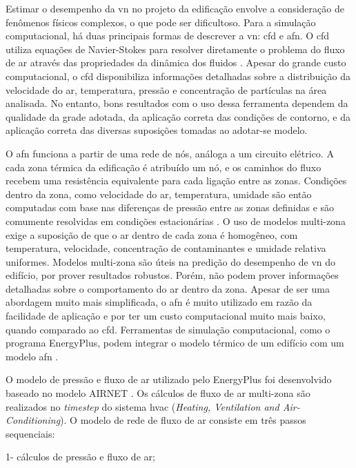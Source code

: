 \documentclass[brazil,hardcopy,openany]{ufscthesis} %
\begin{document}
Estimar o desempenho da \acrshort{vn} no projeto da edificação envolve a consideração de fenômenos físicos complexos, o que pode ser dificultoso. Para a simulação computacional, há duas principais formas de descrever a \acrlong{vn}: \acrfull{cfd} e \acrfull{afn}. O \acrshort{cfd} utiliza equações de Navier-Stokes para resolver diretamente o problema do fluxo de ar através das propriedades da dinâmica dos fluidos \cite{Arendt2017}. Apesar do grande custo computacional, o \acrshort{cfd} disponibiliza informações detalhadas sobre a distribuição da velocidade do ar, temperatura, pressão e concentração de partículas na área analisada. No entanto, bons resultados com o uso dessa ferramenta dependem da qualidade da grade adotada, da aplicação correta das condições de contorno, e da aplicação correta das diversas suposições tomadas ao adotar-se modelo. 

O \acrshort{afn} funciona a partir de uma rede de nós, análoga a um circuito elétrico. A cada zona térmica da edificação é atribuído um nó, e os caminhos do fluxo recebem uma resistência equivalente para cada ligação entre as zonas.
Condições dentro da zona, como velocidade do ar, temperatura, umidade são então computadas com base nas diferenças de pressão entre as zonas definidas e são comumente resolvidas em condições estacionárias \cite{Omrani2017}.	
O uso de modelos multi-zona exige a suposição de que o ar dentro de cada zona é homogêneo, com temperatura, velocidade, concentração de contaminantes e umidade relativa uniformes. Modelos multi-zona são úteis na predição do desempenho de \acrshort{vn} do edifício, por prover resultados robustos. Porém, não podem prover informações detalhadas sobre o comportamento do ar dentro da zona. Apesar de ser uma abordagem muito mais simplificada, o \acrshort{afn} é muito utilizado em razão da facilidade de aplicação e por ter um custo computacional muito mais baixo, quando comparado ao \acrshort{cfd}. Ferramentas de simulação computacional, como o programa EnergyPlus, podem integrar o modelo térmico de um edifício com um modelo \acrshort{afn} \cite{Belleri2014}.

O modelo de pressão e fluxo de ar utilizado pelo EnergyPlus \cite{EnergyPlus2018} foi desenvolvido baseado no modelo AIRNET \cite{Walton1989}. Os cálculos de fluxo de ar multi-zona são realizados no \textit{timestep} do sistema \acrshort{hvac} (\textit{Heating, Ventilation and Air-Conditioning}). O modelo de rede de fluxo de ar consiste em três passos sequenciais:

1- cálculos de pressão e fluxo de ar;
\end{document}
